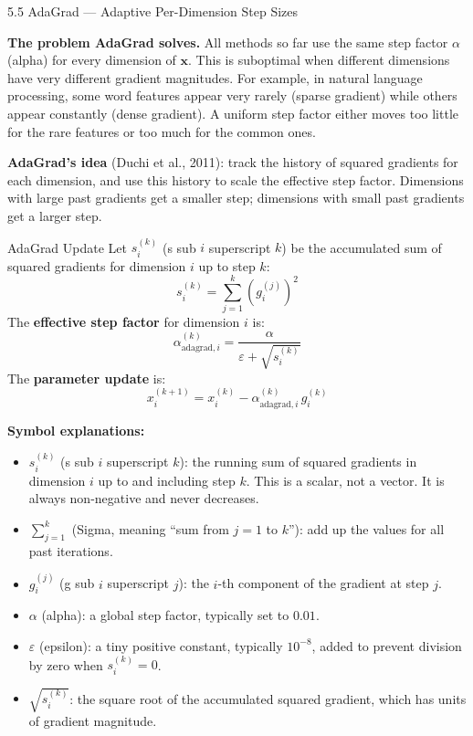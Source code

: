 \documentclass[aspectratio=169,10pt]{beamer}
\newcommand{\vx}{\mathbf{x}}
\begin{document}
\begin{frame}[allowframebreaks]{5.5 AdaGrad --- Adaptive Per-Dimension Step Sizes}

  \textbf{The problem AdaGrad solves.}  All methods so far use
  the same step factor $\alpha$ (alpha) for every dimension of
  $\vx$.  This is suboptimal when different dimensions have
  very different gradient magnitudes.  For example, in natural
  language processing, some word features appear very rarely
  (sparse gradient) while others appear constantly (dense
  gradient).  A uniform step factor either moves too little
  for the rare features or too much for the common ones.

  \vspace{0.5em}
  \textbf{AdaGrad's idea} (Duchi et al., 2011): track the
  history of squared gradients for each dimension, and use this
  history to scale the effective step factor.  Dimensions with
  large past gradients get a smaller step; dimensions with small
  past gradients get a larger step.

  \begin{block}{AdaGrad Update}
    Let $s_i^{(k)}$ (s sub $i$ superscript $k$) be the
    accumulated sum of squared gradients for dimension $i$
    up to step $k$:
    \[
      s_i^{(k)} = \sum_{j=1}^{k}\!\left(g_i^{(j)}\right)^2
    \]
    The \textbf{effective step factor} for dimension $i$ is:
    \[
      \alpha_{\mathrm{adagrad},i}^{(k)}
      = \frac{\alpha}{\varepsilon + \sqrt{s_i^{(k)}}}
    \]
    The \textbf{parameter update} is:
    \[
      x_i^{(k+1)} = x_i^{(k)}
        - \alpha_{\mathrm{adagrad},i}^{(k)}\,g_i^{(k)}
    \]
  \end{block}

  \framebreak

  \textbf{Symbol explanations:}
  \begin{itemize}
    \item $s_i^{(k)}$ (s sub $i$ superscript $k$): the running
          sum of squared gradients in dimension $i$ up to and
          including step $k$.  This is a scalar, not a vector.
          It is always non-negative and never decreases.
    \item $\sum_{j=1}^{k}$ (Sigma, meaning ``sum from $j=1$
          to $k$''): add up the values for all past iterations.
    \item $g_i^{(j)}$ (g sub $i$ superscript $j$): the $i$-th
          component of the gradient at step $j$.
    \item $\alpha$ (alpha): a global step factor, typically
          set to $0.01$.
    \item $\varepsilon$ (epsilon): a tiny positive constant,
          typically $10^{-8}$, added to prevent division by zero
          when $s_i^{(k)} = 0$.
    \item $\sqrt{s_i^{(k)}}$: the square root of the accumulated
          squared gradient, which has units of gradient magnitude.
  \end{itemize}


\end{frame}
\end{document}
